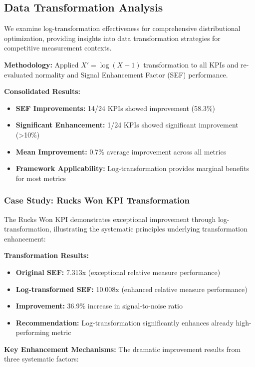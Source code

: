\subsection{Data Transformation Analysis}

We examine log-transformation effectiveness for comprehensive distributional optimization, providing insights into data transformation strategies for competitive measurement contexts.

\textbf{Methodology:} Applied $X' = \log(X + 1)$ transformation to all KPIs and re-evaluated normality and Signal Enhancement Factor (SEF) performance.

\textbf{Consolidated Results:}
\begin{itemize}
    \item \textbf{SEF Improvements:} 14/24 KPIs showed improvement (58.3\%)
    \item \textbf{Significant Enhancement:} 1/24 KPIs showed significant improvement (>10\%)
    \item \textbf{Mean Improvement:} 0.7\% average improvement across all metrics
    \item \textbf{Framework Applicability:} Log-transformation provides marginal benefits for most metrics
\end{itemize}

\subsubsection{Case Study: Rucks Won KPI Transformation}

The Rucks Won KPI demonstrates exceptional improvement through log-transformation, illustrating the systematic principles underlying transformation enhancement:

\textbf{Transformation Results:}
\begin{itemize}
    \item \textbf{Original SEF:} 7.313x (exceptional relative measure performance)
    \item \textbf{Log-transformed SEF:} 10.008x (enhanced relative measure performance)  
    \item \textbf{Improvement:} 36.9\% increase in signal-to-noise ratio
    \item \textbf{Recommendation:} Log-transformation significantly enhances already high-performing metric
\end{itemize}

\textbf{Key Enhancement Mechanisms:}
The dramatic improvement results from three systematic factors:

